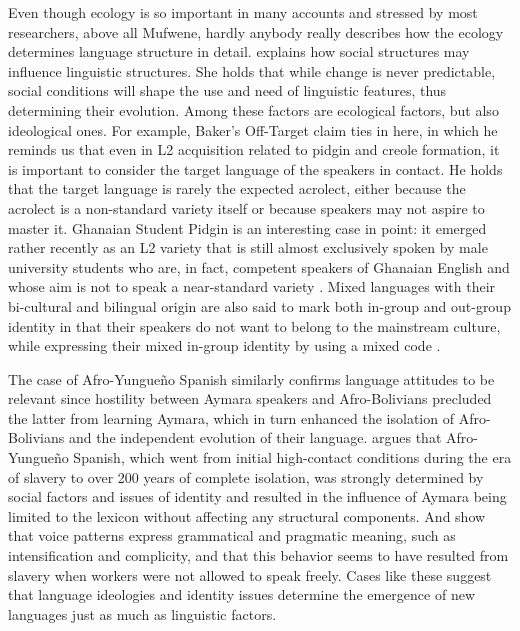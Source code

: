 \documentclass[output=paper]{langscibook}
\begin{document}
Even though ecology is so important in many accounts and stressed by most researchers, above all Mufwene, hardly anybody really describes how the ecology determines language structure in detail. \citet{jourdan2008cultural} explains how social structures may influence linguistic structures. She holds that while change is never predictable, social conditions will shape the use and need of linguistic features, thus determining their evolution. Among these factors are ecological factors, but also ideological ones. For example, Baker’s \parencite*{baker1999investigating} Off-Target claim ties in here, in which he reminds us that even in L2 acquisition related to pidgin and creole formation, it is important to consider the target language of the speakers in contact. He holds that the target language is rarely the expected acrolect, either because the acrolect is a non-standard variety itself or because speakers may not aspire to master it. Ghanaian Student Pidgin is an interesting case in point: it emerged rather recently as an L2 variety that is still almost exclusively spoken by male university students who are, in fact, competent speakers of Ghanaian English and whose aim is not to speak a near-standard variety \citep{huber1999ghanaian, rupp2013function}. Mixed languages with their bi-cultural and bilingual origin are also said to mark both in-group and out-group identity in that their speakers do not want to belong to the mainstream culture, while expressing their mixed in-group identity by using a mixed code \citep{muysken1997media}.

The case of Afro-Yungueño Spanish similarly confirms language attitudes to be relevant since hostility between Aymara speakers and Afro-Bolivians precluded the latter from learning Aymara, which in turn enhanced the isolation of Afro-Bolivians and the independent evolution of their language. \citet{perezFcsocial} argues that Afro-Yungueño Spanish, which went from initial high-contact conditions during the era of slavery to over 200 years of complete isolation, was strongly determined by social factors and issues of identity and resulted in the influence of Aymara being limited to the lexicon without affecting any structural components. And \citet{perezetal2019relevance} show that voice patterns express grammatical and pragmatic meaning, such as intensification and complicity, and that this behavior seems to have resulted from slavery when workers were not allowed to speak freely. Cases like these suggest that language ideologies and identity issues determine the emergence of new languages just as much as linguistic factors.
\end{document}
